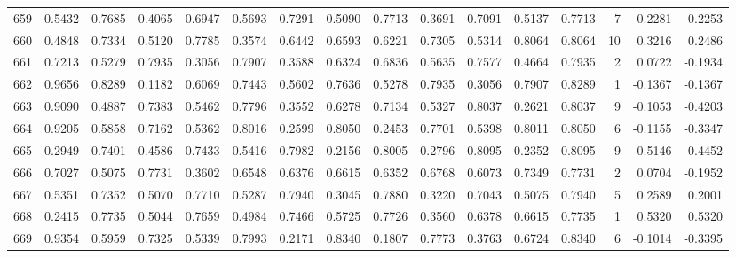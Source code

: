 \begin{tabular}{lrrrrrrrrrrrrrrr}
659 &      0.5432 &  0.7685 &  0.4065 &  0.6947 &  0.5693 &  0.7291 &  0.5090 &  0.7713 &  0.3691 &  0.7091 &   0.5137 &     0.7713 &      7 &                    0.2281 &                     0.2253 \\
660 &      0.4848 &  0.7334 &  0.5120 &  0.7785 &  0.3574 &  0.6442 &  0.6593 &  0.6221 &  0.7305 &  0.5314 &   0.8064 &     0.8064 &     10 &                    0.3216 &                     0.2486 \\
661 &      0.7213 &  0.5279 &  0.7935 &  0.3056 &  0.7907 &  0.3588 &  0.6324 &  0.6836 &  0.5635 &  0.7577 &   0.4664 &     0.7935 &      2 &                    0.0722 &                    -0.1934 \\
662 &      0.9656 &  0.8289 &  0.1182 &  0.6069 &  0.7443 &  0.5602 &  0.7636 &  0.5278 &  0.7935 &  0.3056 &   0.7907 &     0.8289 &      1 &                   -0.1367 &                    -0.1367 \\
663 &      0.9090 &  0.4887 &  0.7383 &  0.5462 &  0.7796 &  0.3552 &  0.6278 &  0.7134 &  0.5327 &  0.8037 &   0.2621 &     0.8037 &      9 &                   -0.1053 &                    -0.4203 \\
664 &      0.9205 &  0.5858 &  0.7162 &  0.5362 &  0.8016 &  0.2599 &  0.8050 &  0.2453 &  0.7701 &  0.5398 &   0.8011 &     0.8050 &      6 &                   -0.1155 &                    -0.3347 \\
665 &      0.2949 &  0.7401 &  0.4586 &  0.7433 &  0.5416 &  0.7982 &  0.2156 &  0.8005 &  0.2796 &  0.8095 &   0.2352 &     0.8095 &      9 &                    0.5146 &                     0.4452 \\
666 &      0.7027 &  0.5075 &  0.7731 &  0.3602 &  0.6548 &  0.6376 &  0.6615 &  0.6352 &  0.6768 &  0.6073 &   0.7349 &     0.7731 &      2 &                    0.0704 &                    -0.1952 \\
667 &      0.5351 &  0.7352 &  0.5070 &  0.7710 &  0.5287 &  0.7940 &  0.3045 &  0.7880 &  0.3220 &  0.7043 &   0.5075 &     0.7940 &      5 &                    0.2589 &                     0.2001 \\
668 &      0.2415 &  0.7735 &  0.5044 &  0.7659 &  0.4984 &  0.7466 &  0.5725 &  0.7726 &  0.3560 &  0.6378 &   0.6615 &     0.7735 &      1 &                    0.5320 &                     0.5320 \\
669 &      0.9354 &  0.5959 &  0.7325 &  0.5339 &  0.7993 &  0.2171 &  0.8340 &  0.1807 &  0.7773 &  0.3763 &   0.6724 &     0.8340 &      6 &                   -0.1014 &                    -0.3395 \\

\end{tabular}
